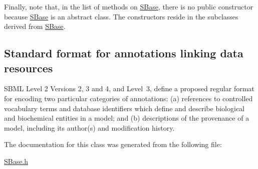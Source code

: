 Finally, note that, in the list of methods on \hyperlink{class_s_base}{S\+Base}, there is no public constructor because \hyperlink{class_s_base}{S\+Base} is an abstract class. The constructors reside in the subclasses derived from \hyperlink{class_s_base}{S\+Base}.\hypertarget{class_s_base_sbase-miriam}{}\subsection{Standard format for annotations linking data resources}\label{class_s_base_sbase-miriam}
S\+B\+ML Level 2 Versions 2, 3 and 4, and Level~3, define a proposed regular format for encoding two particular categories of annotations\+: (a) references to controlled vocabulary terms and database identifiers which define and describe biological and biochemical entities in a model; and (b) descriptions of the provenance of a model, including its author(s) and modification history. 

The documentation for this class was generated from the following file\+:\begin{DoxyCompactItemize}
\item 
\hyperlink{_s_base_8h}{S\+Base.\+h}\end{DoxyCompactItemize}
